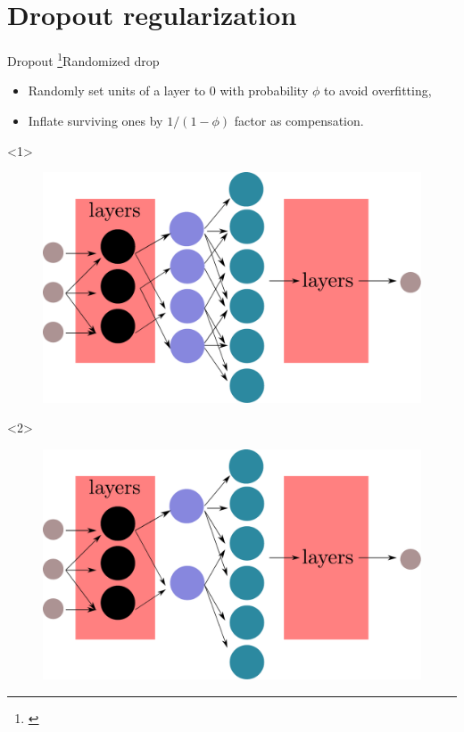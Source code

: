 \documentclass[10pt,aspectratio=43]{beamer}
\begin{document}
\section{Dropout regularization}
\begin{frame}{Dropout \footnote[frame]{\citet{srivastava2014dropout}}}{Randomized drop}
    \begin{itemize}
        \item Randomly set units of a layer to $0$ with probability $\phi$ to avoid overfitting,
        \item Inflate surviving ones by $1/(1-\phi)$ factor as compensation.
    \end{itemize}

    \begin{onlyenv}<1>
        \begin{figure}
            \centering
            \includegraphics[scale=.4]{dropout_structure.pdf}
        \end{figure}
    \end{onlyenv}
    \begin{onlyenv}<2>
        \begin{figure}
            \centering
            \includegraphics[scale=.4]{dropout_structure_applied.pdf}
        \end{figure}
    \end{onlyenv}

\end{frame}
\end{document}
